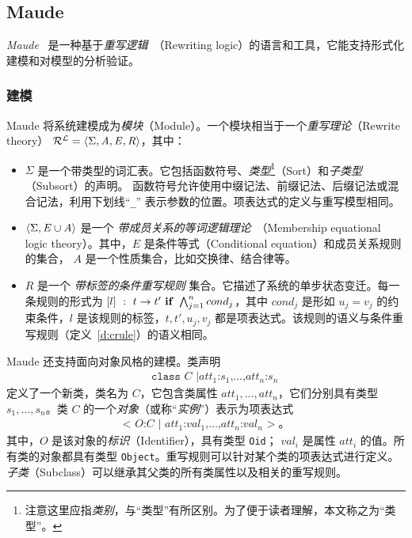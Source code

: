 \subsection{Maude}

\emph{Maude}~\cite{DBLP:journals/tcs/ClavelDELMMQ02} 是一种基于\emph{重写逻辑}~\cite{DBLP:journals/jlp/Meseguer12}（Rewriting logic）的语言和工具，它能支持形式化建模和对模型的分析验证。

\subsubsection{建模}
Maude 将系统建模成为\emph{模块}（Module）。一个模块相当于一个\emph{重写理论}（Rewrite theory） 
$\mathcal{R^L} = \langle\Sigma,\mathit{A},\mathit{E} , \mathit{R}\rangle$，其中：
\begin{itemize}
\item $\Sigma$ 是一个带类型的词汇表。它包括函数符号、\emph{类型}\footnote{注意这里应指\emph{类别}，与“类型”有所区别。为了便于读者理解，本文称之为“类型”。}（Sort）和\emph{子类型}（Subsort）的声明。 函数符号允许使用中缀记法、前缀记法、后缀记法或混合记法，利用下划线“\verb|_|” 表示参数的位置。项表达式的定义与重写模型相同。
\item $\langle\Sigma, \mathit{E}\cup\mathit{A}\rangle$ 是一个 \emph{带成员关系的等词逻辑理论}~\cite{DBLP:journals/tcs/BouhoulaJM00}（Membership equational logic theory）。其中，$\mathit{E}$ 是条件等式（Conditional equation）和成员关系规则的集合，
$\mathit{A}$ 是一个性质集合，比如交换律、结合律等。
\item $\mathit{R}$ 是一个 \emph{带标签的条件重写规则} 集合。它描述了系统的单步状态变迁。每一条规则的形式为 $[l]~:~t\rightarrow t'\mbox{ \textbf{if}
  }\bigwedge^n_{j=1}cond_j$，其中 $cond_j$ 是形如 $u_j=v_j$ 的约束条件，$l$ 是该规则的标签，$t,t',u_j,v_j$ 都是项表达式。该规则的语义与条件重写规则（定义~\ref{d:crule}）的语义相同。
\end{itemize}

Maude 还支持面向对象风格的建模。类声明
\begin{eqnarray}
& & \texttt{class }C\texttt{ |
}att_1\texttt{:}s_1\texttt{,}\ldots\texttt{,}att_n\texttt{:}s_n \nonumber
\end{eqnarray}
定义了一个新类，类名为 $C$，它包含类属性 $att_1,\ldots,att_n$，它们分别具有类型 $s_1,\ldots,s_n$。类 $C$ 的一个\emph{对象}（或称“\emph{实例}”）表示为项表达式
\begin{eqnarray}
\texttt{< } O\texttt{:} C \texttt{ | }
att_1\texttt{:}val_1\texttt{,} \ldots
\texttt{,}att_n\texttt{:}val_n\texttt{ >} \;\mbox{。} \nonumber
\end{eqnarray}
其中，$O$ 是该对象的\emph{标识}（Identifier），具有类型 \verb|Oid|；
$val_i$ 是属性 $att_i$ 的值。所有类的对象都具有类型 \verb|Object|。重写规则可以针对某个类的项表达式进行定义。\emph{子类}（Subclass）可以继承其父类的所有类属性以及相关的重写规则。

